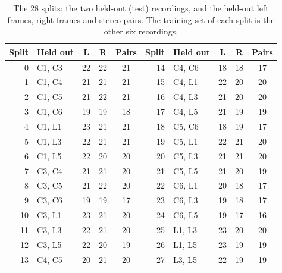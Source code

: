\begin{table}[H]
\centering
\caption{The 28 splits: the two held-out (test) recordings, and the held-out left frames, right frames and
stereo pairs. The training set of each split is the other six recordings.}
\label{tab:app:splits}
\small
\begin{tabular}{rlccc@{\hspace{2.5em}}rlccc}
\toprule
Split & Held out & L & R & Pairs & Split & Held out & L & R & Pairs \\
\midrule
 0 & C1, C3 & 22 & 22 & 21 & 14 & C4, C6 & 18 & 18 & 17 \\
 1 & C1, C4 & 21 & 21 & 21 & 15 & C4, L1 & 22 & 20 & 20 \\
 2 & C1, C5 & 21 & 22 & 21 & 16 & C4, L3 & 21 & 20 & 20 \\
 3 & C1, C6 & 19 & 19 & 18 & 17 & C4, L5 & 21 & 19 & 19 \\
 4 & C1, L1 & 23 & 21 & 21 & 18 & C5, C6 & 18 & 19 & 17 \\
 5 & C1, L3 & 22 & 21 & 21 & 19 & C5, L1 & 22 & 21 & 20 \\
 6 & C1, L5 & 22 & 20 & 20 & 20 & C5, L3 & 21 & 21 & 20 \\
 7 & C3, C4 & 21 & 21 & 20 & 21 & C5, L5 & 21 & 20 & 19 \\
 8 & C3, C5 & 21 & 22 & 20 & 22 & C6, L1 & 20 & 18 & 17 \\
 9 & C3, C6 & 19 & 19 & 17 & 23 & C6, L3 & 19 & 18 & 17 \\
10 & C3, L1 & 23 & 21 & 20 & 24 & C6, L5 & 19 & 17 & 16 \\
11 & C3, L3 & 22 & 21 & 20 & 25 & L1, L3 & 23 & 20 & 20 \\
12 & C3, L5 & 22 & 20 & 19 & 26 & L1, L5 & 23 & 19 & 19 \\
13 & C4, C5 & 20 & 21 & 20 & 27 & L3, L5 & 22 & 19 & 19 \\
\bottomrule
\end{tabular}
\end{table}

